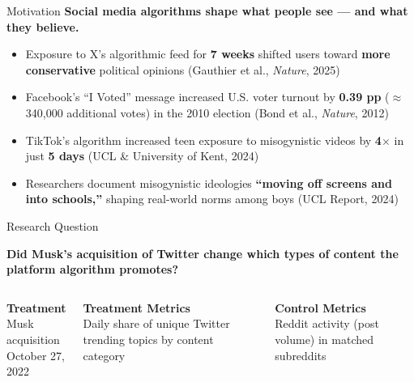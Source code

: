 \documentclass[aspectratio=169,t]{beamer}
\newcommand{\orange}[1]{\textcolor{uteporange}{\textbf{#1}}}
\newcommand{\gray}[1]{\textcolor{utepsilver}{#1}}
\begin{document}
\begin{frame}{Motivation}
{\color{utepblue}\bfseries Social media algorithms shape what people see — and what they believe.}
\vspace{0.5em}
\begin{itemize}\setlength\itemsep{0.55em}
  \item Exposure to X's algorithmic feed for \orange{7 weeks} shifted users toward
        \orange{more conservative} political opinions
        \gray{\scriptsize(Gauthier et al., \textit{Nature}, 2025)}

  \item Facebook's ``I Voted'' message increased U.S. voter turnout by
        \orange{0.39 pp} ($\approx$340{,}000 additional votes) in the 2010 election
        \gray{\scriptsize(Bond et al., \textit{Nature}, 2012)}

  \item TikTok's algorithm increased teen exposure to misogynistic videos by
        \orange{4$\times$} in just \orange{5 days}
        \gray{\scriptsize(UCL \& University of Kent, 2024)}

  \item Researchers document misogynistic ideologies \orange{``moving off screens
        and into schools,''} shaping real-world norms among boys
        \gray{\scriptsize(UCL Report, 2024)}
\end{itemize}
\end{frame}

\begin{frame}{Research Question}
\vspace{0.4em}
\begin{block}{}
  \centering\large\bfseries
  Did Musk's acquisition of Twitter change which types of content the platform algorithm promotes?
\end{block}

\vspace{1em}
\begin{columns}[T]
    \centering
    \orange{Treatment}\\[0.3em]
    \small Musk acquisition\\October 27, 2022

    \centering
    \orange{Treatment Metrics}\\[0.3em]
    \small Daily share of unique Twitter trending topics by content category

    \centering
    \orange{Control Metrics}\\[0.3em]
    \small Reddit activity (post volume) in matched subreddits
\end{columns}
\end{frame}
\end{document}
